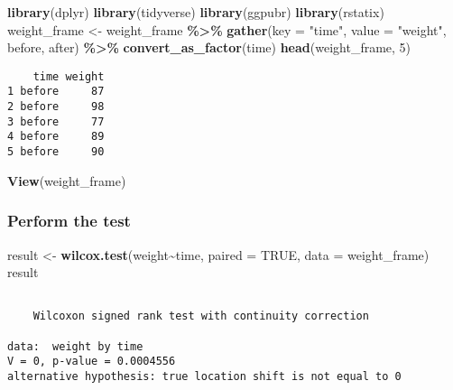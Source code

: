 \documentclass[
]{article}
\newenvironment{Shaded}{\begin{snugshade}}{\end{snugshade}}
\newcommand{\AttributeTok}[1]{\textcolor[rgb]{0.13,0.29,0.53}{#1}}
\newcommand{\ConstantTok}[1]{\textcolor[rgb]{0.56,0.35,0.01}{#1}}
\newcommand{\DecValTok}[1]{\textcolor[rgb]{0.00,0.00,0.81}{#1}}
\newcommand{\FunctionTok}[1]{\textcolor[rgb]{0.13,0.29,0.53}{\textbf{#1}}}
\newcommand{\NormalTok}[1]{#1}
\newcommand{\OtherTok}[1]{\textcolor[rgb]{0.56,0.35,0.01}{#1}}
\newcommand{\SpecialCharTok}[1]{\textcolor[rgb]{0.81,0.36,0.00}{\textbf{#1}}}
\newcommand{\StringTok}[1]{\textcolor[rgb]{0.31,0.60,0.02}{#1}}
\begin{document}
\begin{Shaded}
\begin{Highlighting}[]
\FunctionTok{library}\NormalTok{(dplyr)}
\FunctionTok{library}\NormalTok{(tidyverse)}
\FunctionTok{library}\NormalTok{(ggpubr)}
\FunctionTok{library}\NormalTok{(rstatix)}
\NormalTok{weight\_frame }\OtherTok{\textless{}{-}}\NormalTok{ weight\_frame }\SpecialCharTok{\%\textgreater{}\%}
  \FunctionTok{gather}\NormalTok{(}\AttributeTok{key =} \StringTok{"time"}\NormalTok{, }\AttributeTok{value =} \StringTok{"weight"}\NormalTok{, before, after) }\SpecialCharTok{\%\textgreater{}\%}
  \FunctionTok{convert\_as\_factor}\NormalTok{(time)}
\FunctionTok{head}\NormalTok{(weight\_frame, }\DecValTok{5}\NormalTok{)}
\end{Highlighting}
\end{Shaded}

\begin{verbatim}
    time weight
1 before     87
2 before     98
3 before     77
4 before     89
5 before     90
\end{verbatim}

\begin{Shaded}
\begin{Highlighting}[]
\FunctionTok{View}\NormalTok{(weight\_frame)}
\end{Highlighting}
\end{Shaded}

\hypertarget{perform-the-test-2}{%
\subsubsection{Perform the test}\label{perform-the-test-2}}

\begin{Shaded}
\begin{Highlighting}[]
\NormalTok{result }\OtherTok{\textless{}{-}} \FunctionTok{wilcox.test}\NormalTok{(weight}\SpecialCharTok{\textasciitilde{}}\NormalTok{time, }\AttributeTok{paired =} \ConstantTok{TRUE}\NormalTok{, }\AttributeTok{data =}\NormalTok{ weight\_frame)}
\NormalTok{result}
\end{Highlighting}
\end{Shaded}

\begin{verbatim}

    Wilcoxon signed rank test with continuity correction

data:  weight by time
V = 0, p-value = 0.0004556
alternative hypothesis: true location shift is not equal to 0
\end{verbatim}
\end{document}
